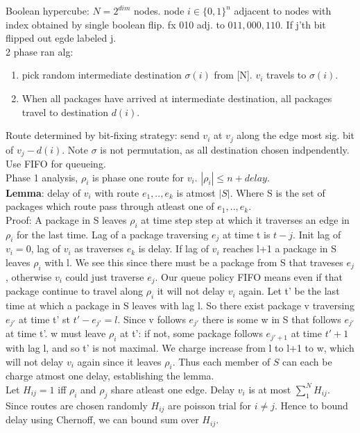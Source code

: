 \documentclass[a4paper]{article}
\begin{document}
Boolean hypercube: \(N=2^{dim}\) nodes. node \(i \in \{0,1\}^n\) adjacent to nodes with index obtained by single boolean flip. fx 010 adj. to \(011,000,110\). If j'th bit flipped out egde labeled j.\\
2 phase ran alg:
\begin{enumerate}
\item pick random intermediate destination \(\sigma(i)\) from [N]. \(v_i\) travels to \(\sigma(i)\).
\item When all packages have arrived at intermediate destination, all packages travel to destination \(d(i)\).
\end{enumerate}
Route determined by bit-fixing strategy: send \(v_i\) at \(v_j\) along the edge most sig. bit of \(v_j - d(i)\). Note \(\sigma\) is not permutation, as all destination chosen indpendently. Use FIFO for queueing.\\
Phase 1 analysis, \(\rho_i\) is phase one route for \(v_i\). \(|\rho_i| \leq n+delay\).\\
\textbf{Lemma}: delay of \(v_i\) with route \(e_1,..,e_k\) is atmost \(|S|\). Where S is the set of packages which route pass through atleast one of \(e_1,..,e_k\).\\
Proof: A package in S leaves \(\rho_i\) at time step step at which it traverses an edge in \(\rho_i\) for the last time. Lag of a package traversing \(e_j\) at time t is \(t-j\). Init lag of \(v_i=0\), lag of \(v_i\) as traverses \(e_k\) is delay. If lag of \(v_i\) reaches l+1 a package in S leaves \(\rho_i\) with l. We see this since there must be a package from S that traveses \(e_j\), otherwise \(v_i\) could just traverse \(e_j\). Our queue policy FIFO means even if that package continue to travel along \(\rho_i\) it will not delay \(v_i\) again.  Let t' be the last time at which a package in S leaves with lag l. So there exist package v traversing \(e_{j'}\) at time t' st \(t'-e_{j'} = l\). Since v follows \(e_{j'}\) there is some w in S that follows \(e_{j'}\) at time t'. w must leave \(\rho_i\) at t': if not, some package follows \(e_{j'+1}\) at time \(t'+1\) with lag l, and so t' is not maximal. We charge increase from l to l+1 to w, which will not delay \(v_i\) again since it leaves \(\rho_i\). Thus each member of \(S\) can each be charge atmost one delay, establishing the lemma.\\
Let \(H_{ij}=1\) iff \(\rho_i\) and \(\rho_j\) share atleast one edge. Delay \(v_i\) is at most \(\sum_1^N H_{ij}\). Since routes are chosen randomly \(H_{ij}\) are poisson trial for \(i\neq j\). Hence to bound delay using Chernoff, we can bound sum over \(H_{ij}\).\\
\end{document}
